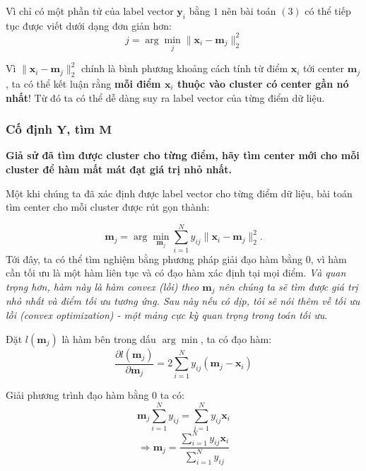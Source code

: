 Vì chỉ có một phần tử của label vector $\mathbf{y}_i$ bằng $1$ nên bài toán $(3)$ có thể tiếp tục được viết dưới dạng đơn giản hơn:  
\begin{equation}
j = \arg\min_{j} \|\mathbf{x}_i - \mathbf{m}_j\|_2^2 
\end{equation}
 
Vì $\|\mathbf{x}_i - \mathbf{m}_j\|_2^2$ chính là bình phương khoảng cách tính từ điểm $\mathbf{x}_i $ tới center $\mathbf{m}_j $, ta có thể kết luận rằng \textbf{mỗi điểm $\mathbf{x}_i $ thuộc vào cluster có center gần nó nhất}! Từ đó ta có thể dễ dàng suy ra label vector của từng điểm dữ liệu. 
 
 
\subsubsection{Cố định $\mathbf{Y} $, tìm $\mathbf{M}$ }
\textbf{Giả sử đã tìm được cluster cho từng điểm, hãy tìm center mới cho mỗi cluster để hàm mất mát đạt giá trị nhỏ nhất.} 
 
Một khi chúng ta đã xác định được label vector cho từng điểm dữ liệu, bài toán tìm center cho mỗi cluster được rút gọn thành:  
 
\begin{equation}
\mathbf{m}_j = \arg\min_{\mathbf{m}_j} \sum_{i = 1}^{N} y_{ij}\|\mathbf{x}_i - \mathbf{m}_j \|_2^2. 
\end{equation}
 Tới đây, ta có thể tìm nghiệm bằng phương pháp giải đạo hàm bằng 0, vì hàm cần tối ưu là một hàm liên tục và có đạo hàm xác định tại mọi điểm. \textit{Và quan trọng hơn, hàm này là hàm convex (lồi) theo $\mathbf{m}_j $ nên chúng ta sẽ tìm được giá trị nhỏ nhất và điểm tối ưu tương ứng. Sau này nếu có dịp, tôi sẽ nói thêm về tối ưu lồi (convex optimization) - một mảng cực kỳ quan trọng trong toán tối ưu}. 
 
 Đặt $l(\mathbf{m}_j)$ là hàm bên trong dấu $\arg\min$, ta có đạo hàm: 
\begin{equation}
\frac{\partial l(\mathbf{m}_j)}{\partial \mathbf{m}_j} = 2\sum_{i=1}^N y_{ij}(\mathbf{m}_j - \mathbf{x}_i)  
\end{equation}
 
Giải phương trình đạo hàm bằng 0 ta có:  
\begin{equation}
\mathbf{m}_j \sum_{i=1}^N y_{ij} = \sum_{i=1}^N y_{ij} \mathbf{x}_i  
\end{equation}
\begin{equation}
\Rightarrow \mathbf{m}_j = \frac{ \sum_{i=1}^N y_{ij} \mathbf{x}_i}{\sum_{i=1}^N y_{ij}} 
\end{equation}
 
